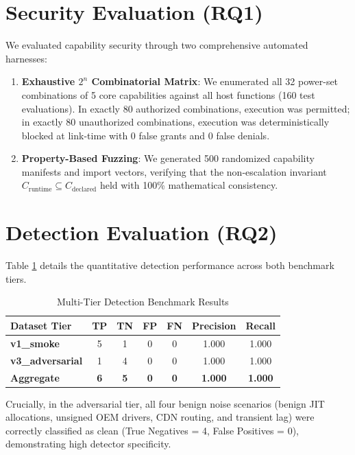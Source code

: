 \documentclass[10pt,conference]{IEEEtran}
\begin{document}
\section{Security Evaluation (RQ1)}
We evaluated capability security through two comprehensive automated harnesses:
\begin{enumerate}
    \item \textbf{Exhaustive $2^n$ Combinatorial Matrix}: We enumerated all 32 power-set combinations of 5 core capabilities against all host functions (160 test evaluations). In exactly 80 authorized combinations, execution was permitted; in exactly 80 unauthorized combinations, execution was deterministically blocked at link-time with 0 false grants and 0 false denials.
    \item \textbf{Property-Based Fuzzing}: We generated 500 randomized capability manifests and import vectors, verifying that the non-escalation invariant $C_{\text{runtime}} \subseteq C_{\text{declared}}$ held with 100\% mathematical consistency.
\end{enumerate}

\section{Detection Evaluation (RQ2)}
Table \ref{tab:det_eval} details the quantitative detection performance across both benchmark tiers.

\begin{table}[h]
\centering
\caption{Multi-Tier Detection Benchmark Results}
\label{tab:det_eval}
\begin{tabular}{@{}lcccccc@{}}
\toprule
\textbf{Dataset Tier} & \textbf{TP} & \textbf{TN} & \textbf{FP} & \textbf{FN} & \textbf{Precision} & \textbf{Recall} \\ \midrule
\textbf{v1\_smoke} & 5 & 1 & 0 & 0 & 1.000 & 1.000 \\
\textbf{v3\_adversarial} & 1 & 4 & 0 & 0 & 1.000 & 1.000 \\ \midrule
\textbf{Aggregate} & \textbf{6} & \textbf{5} & \textbf{0} & \textbf{0} & \textbf{1.000} & \textbf{1.000} \\ \bottomrule
\end{tabular}
\end{table}

Crucially, in the adversarial tier, all four benign noise scenarios (benign JIT allocations, unsigned OEM drivers, CDN routing, and transient lag) were correctly classified as clean (True Negatives = 4, False Positives = 0), demonstrating high detector specificity.
\end{document}
